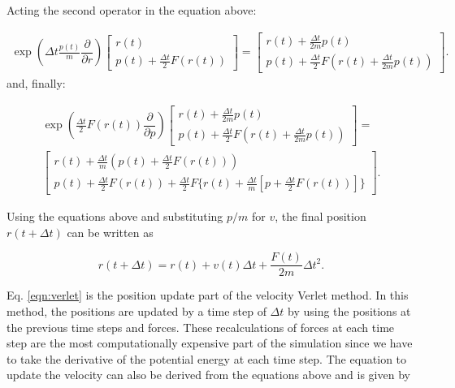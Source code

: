 Acting the second operator in the equation above:

\begin{equation}
\begin{aligned}
\exp \left( \Delta t \frac{p(t)}{m}\dfrac{\partial }{\partial r} \right)
\left[ \begin{array}{c} r(t) \\ p(t) + \frac{\Delta t}{2} F(r(t)) \end{array} \right] = 
\left[ \begin{array}{c} r(t) + \frac{\Delta t}{2m}p(t) \\ p(t) + \frac{\Delta t}{2} F(r(t) + \frac{\Delta t}{2m}p(t) ) \end{array} \right] .
\end{aligned}
\end{equation}
and, finally:

\begin{equation}
\begin{aligned}
\exp \left (\frac{\Delta t}{2} F(r(t)) \dfrac{\partial}{\partial p} \right)
\left[ \begin{array}{c} r(t) + \frac{\Delta t}{2m}p(t) \\ p(t) + \frac{\Delta t}{2} F(r(t) + \frac{\Delta t}{2m}p(t) ) \end{array} \right]= \\ 
\left[ \begin{array}{c} r(t) + \frac{\Delta t}{m} (p(t)+\frac{\Delta t}{2} F(r(t))) \\ p(t) + \frac{\Delta t}{2} F(r(t)) + \frac{\Delta t}{2} F\{r(t)+ \frac{\Delta t}{m} [p + \frac{\Delta t}{2}F(r(t))]\}\end{array} \right] .
\end{aligned}
\end{equation}

Using the equations above and substituting $p/m$ for $v$, the final position $r(t+\Delta t)$ can be written as

\begin{equation}
r(t+ \Delta t) = r(t) +v(t) \Delta t + \frac{F(t)}{2m} \Delta t^{2}.
\label{eqn:verlet}
\end{equation}

Eq.  \ref{eqn:verlet} is the position update part of the velocity Verlet method. In this method, the positions are updated by a time step of $\Delta t$ by using the positions at the previous time steps and forces. These recalculations of forces at each time step are the most computationally expensive part of the simulation since we have to take the derivative of the potential energy at each time step. The equation to update the velocity can also be derived from the equations above and is given by

